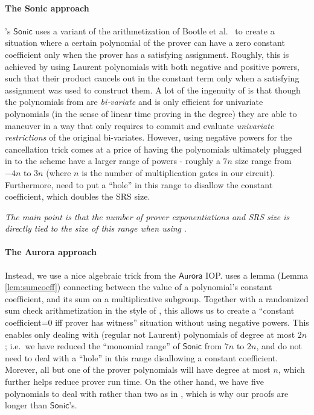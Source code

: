 \documentclass[11pt]{article}
\numberwithin{figure}{section} %
\newcommand{\sonic}{\ensuremath{\mathsf{Sonic}}\xspace}
\newcommand{\aurora}{\ensuremath{\mathsf{Aurora}}\xspace}
\begin{document}
\paragraph{The Sonic approach}
\cite{sonic}'s \sonic uses a variant of the arithmetization of Bootle et al.\ \cite{Bootle} to create a
situation where a certain polynomial of the prover can have a zero constant coefficient only when the prover has a satisfying assignment. Roughly, this is achieved by using Laurent polynomials with both negative and positive powers, such that their product cancels out in the constant term only when a satisfying assignment was used to construct them.
A lot of the ingenuity of \cite{sonic} is that though the polynomials from \cite{Bootle} are \emph{bi-variate}
and \cite{kate} is only efficient for univariate polynomials (in the sense of linear time proving in the degree) they are able to maneuver in a way that only requires to commit and evaluate \emph{univariate restrictions} of the original bi-variates.
However, using negative powers for the cancellation trick comes at a price
of having the polynomials ultimately plugged in to the \cite{kate} scheme  have a larger range of powers - roughly a $7n$ size range from  $-4n$ to $3n$
(where $n$ is the number of multiplication gates in our circuit). Furthermore, \cite{sonic} need to put a ``hole'' in this range to disallow the constant coefficient, which doubles the SRS size.

\emph{The main point is that the number of prover exponentiations and SRS size is directly tied to the size of this range when using \cite{kate}}. 
\paragraph{The Aurora approach}
Instead, we use a nice algebraic trick from the \aurora IOP\cite{aurora}. \cite{aurora} uses a lemma (Lemma \ref{lem:sumcoeff})
connecting between the value of a polynomial's constant coefficient, and its sum on a multiplicative subgroup. Together with a randomized sum check arithmetization in the style of \cite{BCGRS,aurora}, this allows us to create a ``constant coefficient=0 iff prover has witness'' situation without using negative powers.
This enables only dealing with (regular not Laurent) polynomials of degree at most $2n$; i.e.\ we have reduced the ``monomial range'' of \sonic from $7n$ to $2n$, and do not need to deal with a ``hole'' in this range disallowing a constant coefficient. Morever, all but one of the prover polynomials will have  degree at most $n$, which further helps reduce prover run time. On the other hand, we have five polynomials to deal with rather than two as in \cite{sonic}, which is why our proofs are longer than \sonic's.
\end{document}
